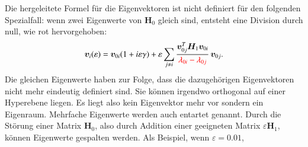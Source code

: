 Die hergeleitete Formel  für die Eigenvektoren ist nicht definiert für den folgenden Spezialfall:
wenn zwei Eigenwerte von $\bm H_0$ gleich sind, entsteht eine Division durch null, wie rot hervorgehoben:
\begin{equation*} %
    \bm v_i(\varepsilon)
    =
    \bm v_{0i} ( 1 + i \varepsilon \gamma ) + \varepsilon \sum_{j \neq i}
    \frac{\bm v_{0j}^T \bm H_1 \bm v_{0i}}{\RD{\lambda_{0i} - \lambda_{0j}}}
    \, \bm v_{0j}.
\end{equation*}
Die gleichen Eigenwerte haben zur Folge, dass die dazugehörigen Eigenvektoren nicht mehr eindeutig definiert sind.
Sie können irgendwo orthogonal auf einer Hyperebene liegen.
Es liegt also kein Eigenvektor mehr vor sondern ein Eigenraum.
Mehrfache Eigenwerte werden auch entartet genannt.
Durch die Störung einer Matrix $\bm H_0$, also durch Addition einer geeigneten Matrix $\varepsilon \bm H_1$, können Eigenwerte gespalten werden.
Als Beispiel, wenn $\varepsilon = 0.01$,
